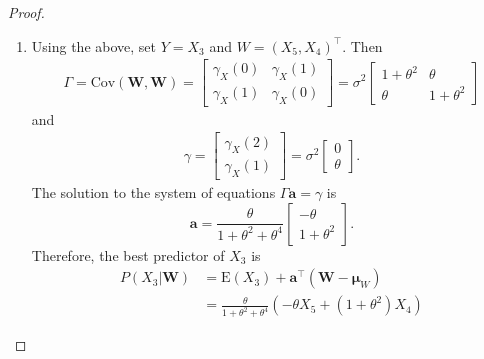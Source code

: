 \documentclass[12pt]{article}
\theoremstyle{definition}
\newcommand{\E}{\text{E}}
\newcommand{\Co}[2]{\text{Cov}\left({#1}, {#2}\right)}
\newcommand{\vect}[1]{\boldsymbol{#1}}
\begin{document}
\begin{proof}
\begin{enumerate}
    \item Using the above, set $Y = X_3$ and $W = (X_5, X_4)^\intercal$. Then
      \begin{align*}
        \Gamma = \Co{\vect{W}}{\vect{W}} =
        \begin{bmatrix} \gamma_X(0) & \gamma_X(1) \\ \gamma_X(1) & \gamma_X(0) \end{bmatrix} =
        \sigma^2 \begin{bmatrix} 1 + \theta^2 & \theta \\ \theta & 1 + \theta^2 \end{bmatrix}
      \end{align*}
      and
      \begin{align*}
        \gamma = \begin{bmatrix} \gamma_X(2) \\ \gamma_X(1) \end{bmatrix}
        = \sigma^2 \begin{bmatrix} 0 \\ \theta \end{bmatrix}.
      \end{align*}
      The solution to the system of equations $\Gamma \vect{a} = \gamma$ is
      $$\vect{a} = \frac{\theta}{1 + \theta^2 + \theta^4} \begin{bmatrix}-\theta\\ 1 + \theta^2 \end{bmatrix}.$$
      Therefore, the best predictor of $X_3$ is
      \begin{align*}
        P(X_3|\vect{W}) &= \E(X_3) + \vect{a}^\intercal (\vect{W} - \vect{\mu}_W) \\
        &= \frac{\theta}{1 + \theta^2 + \theta^4} (- \theta  X_5 + (1 + \theta^2) X_4)
      \end{align*}


\end{enumerate}
\end{proof}
\end{document}
